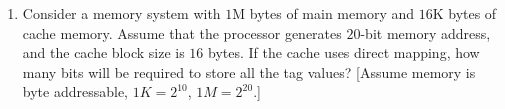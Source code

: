 \documentclass[a4paper, 11pt]{article}
\begin{document}
\begin{enumerate}
    \item Consider a memory system with $1$M bytes of main memory and $16$K bytes of cache memory. Assume that the processor generates $20$-bit memory address, and the cache block size is $16$ bytes. If the cache uses direct mapping, how many bits will be required to store all the tag values? [Assume memory is byte addressable, $1K=2^{10}$, $1M=2^{20}$.]
    \begin{enumerate}
    \end{enumerate}

    \hfill{}


\end{enumerate}
\end{document}
